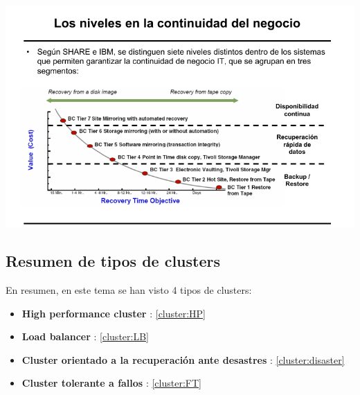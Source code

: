 \begin{center}
\includegraphics[width=\linewidth]{img/continuidad_negocio.png}
\end{center}

\subsection{Resumen de tipos de clusters}
En resumen, en este tema se han visto 4 tipos de clusters:
\begin{itemize}
	\item \textbf{High performance cluster} : \ref{cluster:HP}
	\item \textbf{Load balancer} : \ref{cluster:LB}
	\item \textbf{Cluster orientado a la recuperación ante desastres} : \ref{cluster:disaster}
	\item \textbf{Cluster tolerante a fallos} : \ref{cluster:FT}
\end{itemize}
